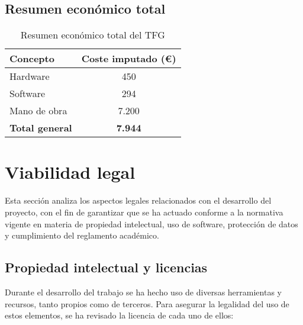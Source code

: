 \subsection{Resumen económico total}

\begin{table}[h]
\centering
\begin{tabular}{|l|c|}
\hline
\textbf{Concepto} & \textbf{Coste imputado (€)} \\
\hline
Hardware & 450 \\
Software & 294 \\
Mano de obra & 7.200 \\
\hline
\textbf{Total general} & \textbf{7.944} \\
\hline
\end{tabular}
\caption{Resumen económico total del TFG}
\end{table}

\section{Viabilidad legal}

Esta sección analiza los aspectos legales relacionados con el desarrollo del proyecto, con el fin de garantizar que se ha actuado conforme a la normativa vigente en materia de propiedad intelectual, uso de software, protección de datos y cumplimiento del reglamento académico.

\subsection{Propiedad intelectual y licencias}

Durante el desarrollo del trabajo se ha hecho uso de diversas herramientas y recursos, tanto propios como de terceros. Para asegurar la legalidad del uso de estos elementos, se ha revisado la licencia de cada uno de ellos:

